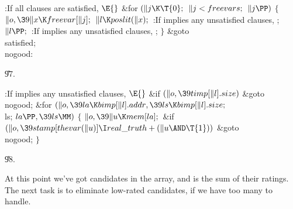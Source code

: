 \B{}:If all clauses are satisfied, \X${}%
\E{}$\6
\&{for} ${}(\|j\K\T{0};{}$ ${}\|j<\\{freevars};{}$ ${}\|j\PP){}$\5
${}\{{}$\1\6
${}\|o,\39\|x\K\\{freevar}[\|j];{}$\6
${}\|l\K\\{poslit}(\|x);{}$\6
:If  implies any unsatisfied clauses, \X;\6
${}\|l\PP;{}$\6
:If  implies any unsatisfied clauses, \X;\6
\4${}\}{}$\2\6
\&{goto} \\{satisfied};\6
\4\\{nogood}:\par
\U97.\fi

\B{}:If  implies any unsatisfied clauses, \X${}\E{}$\6
\&{if} ${}(\|o,\39\\{timp}[\|l].\\{size}){}$\1\5
\&{goto} \\{nogood};\2\6
\&{for} ${}(\|o,\39\\{la}\K\\{bimp}[\|l].\\{addr},\39\\{ls}\K\\{bimp}[\|l].%
\\{size};{}$ \\{ls}; ${}\\{la}\PP,\39\\{ls}\MM){}$\5
${}\{{}$\1\6
${}\|o,\39\|u\K\\{mem}[\\{la}];{}$\6
\&{if} ${}(\|o,\39\\{stamp}[\\{thevar}(\|u)]\I\\{real\_truth}+(\|u\AND%
\T{1})){}$\1\5
\&{goto} \\{nogood};\2\6
\4${}\}{}$\2\par
\U98.\fi

At this point we've got  candidates in the 
array,
and  is the sum of their ratings. The next task is to eliminate
low-rated candidates, if we have too many to handle.

